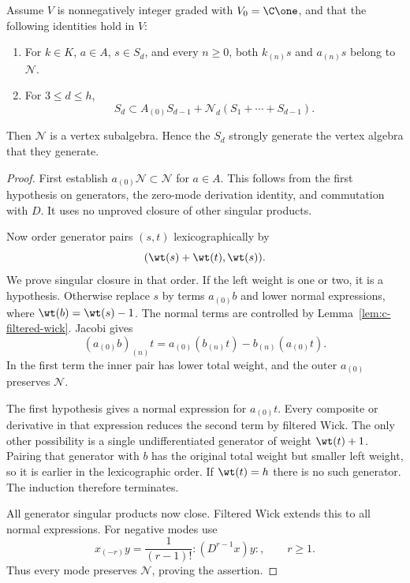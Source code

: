 \begin{theorem}\label{thm:c-recursive}
Assume $V$ is nonnegatively integer graded with $V_0=\C\one$, and
that the following identities hold in $V$:
\begin{enumerate}
\item For $k\in K$, $a\in A$, $s\in S_d$, and every $n\geq0$,
both $k_{(n)}s$ and $a_{(n)}s$ belong to $\mathcal N$.
\item For $3\leq d\leq h$,
\[
 S_d\subset A_{(0)}S_{d-1}
       +\mathcal N_d(S_1+\cdots+S_{d-1}).
\]
\end{enumerate}
Then $\mathcal N$ is a vertex subalgebra. Hence the $S_d$ strongly
generate the vertex algebra that they generate.
\end{theorem}
\begin{proof}
First establish $a_{(0)}\mathcal N\subset\mathcal N$ for $a\in A$.
This follows from the first hypothesis on generators, the zero-mode
derivation identity, and commutation with $D$. It uses no unproved
closure of other singular products.

Now order generator pairs $(s,t)$ lexicographically by
\[
 (\wt(s)+\wt(t),\wt(s)).
\]
We prove singular closure in that order. If the left weight is one or
two, it is a hypothesis. Otherwise replace $s$ by terms $a_{(0)}b$
and lower normal expressions, where $\wt(b)=\wt(s)-1$. The normal
terms are controlled by Lemma~\ref{lem:c-filtered-wick}. Jacobi gives
\begin{equation}\label{eq:c-recursive-jacobi}
 (a_{(0)}b)_{(n)}t
     =a_{(0)}(b_{(n)}t)-b_{(n)}(a_{(0)}t).
\end{equation}
In the first term the inner pair has lower total weight, and the
outer $a_{(0)}$ preserves $\mathcal N$.

The first hypothesis gives a normal expression for $a_{(0)}t$.
Every composite or derivative in that expression reduces the second
term by filtered Wick. The only other possibility is a single
undifferentiated generator of weight $\wt(t)+1$. Pairing that
generator with $b$ has the original total weight but smaller left
weight, so it is earlier in the lexicographic order. If $\wt(t)=h$
there is no such generator. The induction therefore terminates.

All generator singular products now close. Filtered Wick extends this
to all normal expressions. For negative modes use
\[
 x_{(-r)}y=\frac1{(r-1)!}:(D^{r-1}x)y:,
 \qquad r\geq1.
\]
Thus every mode preserves $\mathcal N$, proving the assertion.
\end{proof}

